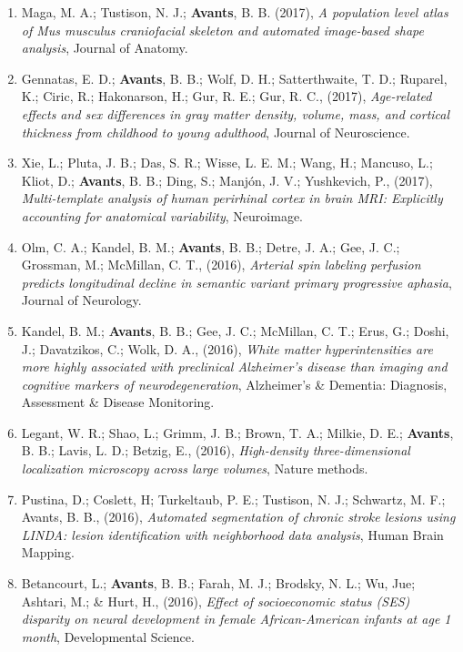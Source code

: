 \documentclass[11pt]{moderncv} %
\begin{document}
\begin{enumerate}
\item Maga, M. A.; Tustison, N. J.; \textbf{Avants}, B. B. (2017), \textit{A population level atlas of Mus musculus craniofacial skeleton and automated image-based shape analysis}, Journal of Anatomy.

\item Gennatas, E. D.; \textbf{Avants}, B. B.; Wolf, D. H.; Satterthwaite, T. D.; Ruparel, K.; Ciric, R.; Hakonarson, H.; Gur, R. E.; Gur, R. C., (2017), \textit{Age-related effects and sex differences in gray matter density, volume, mass, and cortical thickness from childhood to young adulthood}, Journal of Neuroscience.

\item Xie, L.; Pluta, J. B.; Das, S. R.; Wisse, L. E. M.; Wang, H.; Mancuso, L.; Kliot, D.; \textbf{Avants}, B. B.; Ding, S.; Manj{\'o}n, J. V.; Yushkevich, P., (2017), \textit{Multi-template analysis of human perirhinal cortex in brain MRI: Explicitly accounting for anatomical variability}, Neuroimage.

\item Olm, C. A.; Kandel, B. M.; \textbf{Avants}, B. B.; Detre, J. A.; Gee, J. C.; Grossman, M.; McMillan, C. T., (2016), \textit{Arterial spin labeling perfusion predicts longitudinal decline in semantic variant primary progressive aphasia}, Journal of Neurology.

\item Kandel, B. M.; \textbf{Avants}, B. B.; Gee, J. C.; McMillan, C. T.; Erus, G.; Doshi, J.; Davatzikos, C.; Wolk, D. A., (2016), \textit{White matter hyperintensities are more highly associated with preclinical Alzheimer's disease than imaging and cognitive markers of neurodegeneration}, Alzheimer's \& Dementia: Diagnosis, Assessment \& Disease Monitoring.

\item Legant, W. R.; Shao, L.; Grimm, J. B.; Brown, T. A.; Milkie, D. E.; \textbf{Avants}, B. B.; Lavis, L. D.; Betzig, E., (2016), \textit{High-density three-dimensional localization microscopy across large volumes}, Nature methods.

\item Pustina, D.; Coslett, H; Turkeltaub, P. E.; Tustison, N. J.; Schwartz, M. F.; Avants, B. B., (2016), \textit{Automated segmentation of chronic stroke lesions using LINDA: lesion identification with neighborhood data analysis}, Human Brain Mapping.

\item Betancourt, L.; \textbf{Avants}, B. B.; Farah, M. J.; Brodsky, N. L.; Wu, Jue;  Ashtari, M.; \& Hurt, H., (2016), \textit{Effect of socioeconomic status (SES) disparity on neural development in female African-American infants at age 1 month}, Developmental Science.


\end{enumerate}
\end{document}
